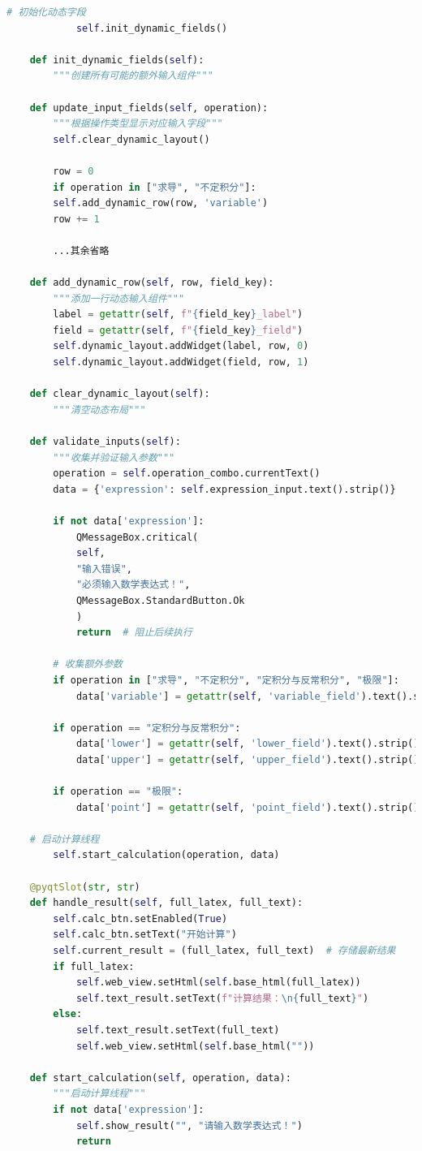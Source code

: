 \documentclass[UTF8,12pt]{ctexart}
\begin{document}
\begin{lstlisting}[language=Python]
			# 初始化动态字段
			self.init_dynamic_fields()
	
	def init_dynamic_fields(self):
		"""创建所有可能的额外输入组件"""
	
	def update_input_fields(self, operation):
		"""根据操作类型显示对应输入字段"""
		self.clear_dynamic_layout()
		
		row = 0
		if operation in ["求导", "不定积分"]:
		self.add_dynamic_row(row, 'variable')
		row += 1
		
		...其余省略
	
	def add_dynamic_row(self, row, field_key):
		"""添加一行动态输入组件"""
		label = getattr(self, f"{field_key}_label")
		field = getattr(self, f"{field_key}_field")
		self.dynamic_layout.addWidget(label, row, 0)
		self.dynamic_layout.addWidget(field, row, 1)
	
	def clear_dynamic_layout(self):
		"""清空动态布局"""
	
	def validate_inputs(self):
		"""收集并验证输入参数"""
		operation = self.operation_combo.currentText()
		data = {'expression': self.expression_input.text().strip()}
	
		if not data['expression']:
			QMessageBox.critical(
			self, 
			"输入错误", 
			"必须输入数学表达式！", 
			QMessageBox.StandardButton.Ok
			)
			return  # 阻止后续执行

		# 收集额外参数
		if operation in ["求导", "不定积分", "定积分与反常积分", "极限"]:
			data['variable'] = getattr(self, 'variable_field').text().strip() or 'x'
		
		if operation == "定积分与反常积分":
			data['lower'] = getattr(self, 'lower_field').text().strip() or '0'
			data['upper'] = getattr(self, 'upper_field').text().strip() or '1'
		
		if operation == "极限":
			data['point'] = getattr(self, 'point_field').text().strip() or '0'
	
	# 启动计算线程
		self.start_calculation(operation, data)
	
	@pyqtSlot(str, str)
	def handle_result(self, full_latex, full_text):
		self.calc_btn.setEnabled(True)
		self.calc_btn.setText("开始计算")
		self.current_result = (full_latex, full_text)  # 存储最新结果
		if full_latex:
			self.web_view.setHtml(self.base_html(full_latex))
			self.text_result.setText(f"计算结果：\n{full_text}")
		else:
			self.text_result.setText(full_text)
			self.web_view.setHtml(self.base_html(""))
	
	def start_calculation(self, operation, data):
		"""启动计算线程"""
		if not data['expression']:
			self.show_result("", "请输入数学表达式！")
			return
		

\end{lstlisting}
\end{document}
